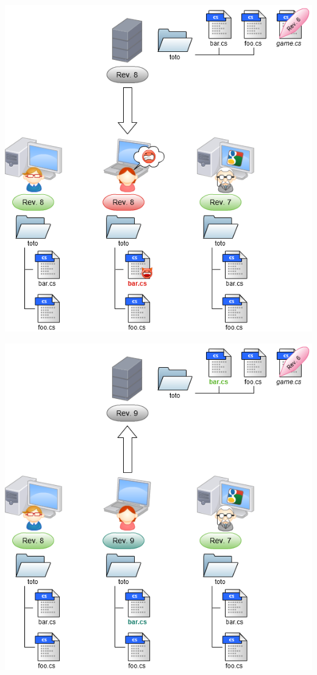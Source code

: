 \begin{frame}
  \begin{center}
    \includegraphics[scale=0.3]{images/14-Conflict.png}
  \end{center}
\end{frame}

\begin{frame}
  \begin{center}
    \includegraphics[scale=0.3]{images/15-Resolved.png}
  \end{center}
\end{frame}

